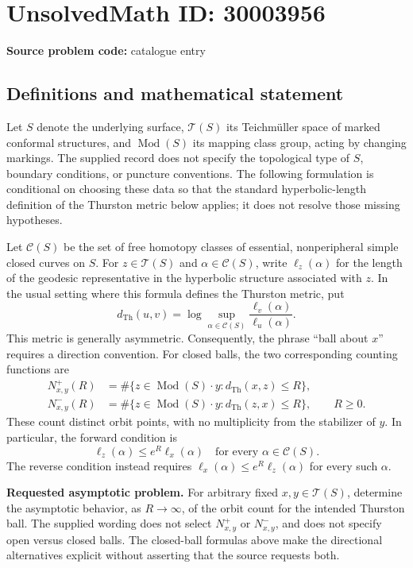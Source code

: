 \documentclass[11pt]{article}
\begin{document}
\section*{UnsolvedMath ID: 30003956}
\textbf{Source problem code:} catalogue entry
\subsection{Definitions and mathematical statement}
Let \(S\) denote the underlying surface, \(\mathcal T(S)\) its Teichm\"uller space of marked conformal structures, and \(\operatorname{Mod}(S)\) its mapping class group, acting by changing markings. The supplied record does not specify the topological type of \(S\), boundary conditions, or puncture conventions. The following formulation is conditional on choosing these data so that the standard hyperbolic-length definition of the Thurston metric below applies; it does not resolve those missing hypotheses.

Let \(\mathcal C(S)\) be the set of free homotopy classes of essential, nonperipheral simple closed curves on \(S\). For \(z\in\mathcal T(S)\) and \(\alpha\in\mathcal C(S)\), write \(\ell_z(\alpha)\) for the length of the geodesic representative in the hyperbolic structure associated with \(z\). In the usual setting where this formula defines the Thurston metric, put
\[
 d_{\mathrm{Th}}(u,v)
 =\log\sup_{\alpha\in\mathcal C(S)}
 \frac{\ell_v(\alpha)}{\ell_u(\alpha)}.
\]
This metric is generally asymmetric. Consequently, the phrase ``ball about \(x\)'' requires a direction convention. For closed balls, the two corresponding counting functions are
\[
\begin{aligned}
 N^+_{x,y}(R)
 &=\#\{z\in\operatorname{Mod}(S)\cdot y:
             d_{\mathrm{Th}}(x,z)\le R\},\\
 N^-_{x,y}(R)
 &=\#\{z\in\operatorname{Mod}(S)\cdot y:
             d_{\mathrm{Th}}(z,x)\le R\},
 \qquad R\ge0.
\end{aligned}
\]
These count distinct orbit points, with no multiplicity from the stabilizer of \(y\). In particular, the forward condition is
\[
 \ell_z(\alpha)\le e^R\ell_x(\alpha)
 \quad\text{for every }\alpha\in\mathcal C(S).
\]
The reverse condition instead requires
\(\ell_x(\alpha)\le e^R\ell_z(\alpha)\) for every such \(\alpha\).

\textbf{Requested asymptotic problem.} For arbitrary fixed \(x,y\in\mathcal T(S)\), determine the asymptotic behavior, as \(R\to\infty\), of the orbit count for the intended Thurston ball. The supplied wording does not select \(N^+_{x,y}\) or \(N^-_{x,y}\), and does not specify open versus closed balls. The closed-ball formulas above make the directional alternatives explicit without asserting that the source requests both.
\end{document}
